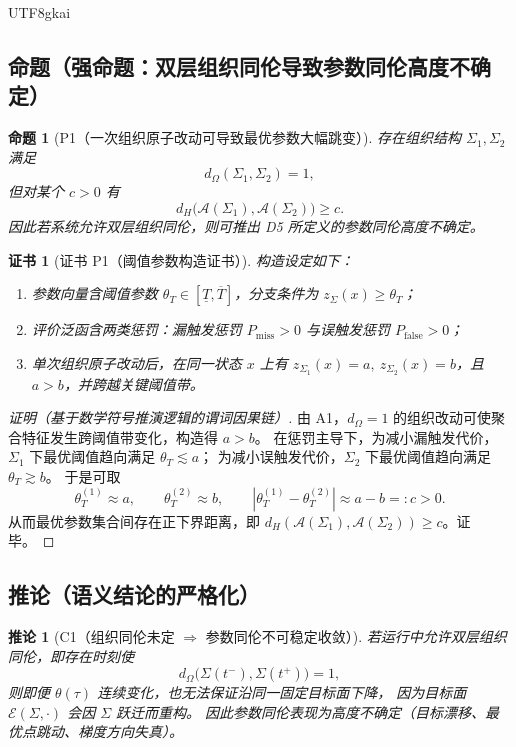 \documentclass[12pt]{article}
\newtheorem{proposition}{命题}[section]
\newtheorem{corollary}{推论}[section]
\newtheorem{Certificate}{证书}[section]
\begin{document}
\begin{CJK*}{UTF8}{gkai}
\subsection{命题（强命题：双层组织同伦导致参数同伦高度不确定）}
\label{subsec:tex28-ch8-props}

\begin{proposition}[P1（一次组织原子改动可导致最优参数大幅跳变）]
\label{prop:tex28-ch8-p1}
存在组织结构 $\Sigma_1,\Sigma_2$ 满足
\[
  d_{\Omega}(\Sigma_1,\Sigma_2)=1,
\]
但对某个 $c>0$ 有
\[
  d_H\bigl(\mathcal{A}(\Sigma_1),\mathcal{A}(\Sigma_2)\bigr)\ge c.
\]
因此若系统允许双层组织同伦，则可推出 D5 所定义的参数同伦高度不确定。
\end{proposition}

\begin{Certificate}[证书 P1（阈值参数构造证书）]
\label{cert:tex28-ch8-p1}
构造设定如下：
\begin{enumerate}
  \item 参数向量含阈值参数 $\theta_T\in[\underline T,\overline T]$，分支条件为 $z_{\Sigma}(x)\ge \theta_T$；
  \item 评价泛函含两类惩罚：漏触发惩罚 $P_{\mathrm{miss}}>0$ 与误触发惩罚 $P_{\mathrm{false}}>0$；
  \item 单次组织原子改动后，在同一状态 $x$ 上有
  $z_{\Sigma_1}(x)=a,\ z_{\Sigma_2}(x)=b$，且 $a>b$，并跨越关键阈值带。
\end{enumerate}
\end{Certificate}

\begin{proof}[证明（基于数学符号推演逻辑的谓词因果链）]
由 A1，$d_{\Omega}=1$ 的组织改动可使聚合特征发生跨阈值带变化，构造得 $a>b$。
在惩罚主导下，为减小漏触发代价，$\Sigma_1$ 下最优阈值趋向满足 $\theta_T\lesssim a$；
为减小误触发代价，$\Sigma_2$ 下最优阈值趋向满足 $\theta_T\gtrsim b$。
于是可取
\[
  \theta_T^{(1)}\approx a,\qquad \theta_T^{(2)}\approx b,\qquad
  |\theta_T^{(1)}-\theta_T^{(2)}|\approx a-b=:c>0.
\]
从而最优参数集合间存在正下界距离，即
$d_H(\mathcal{A}(\Sigma_1),\mathcal{A}(\Sigma_2))\ge c$。证毕。
\end{proof}

\subsection{推论（语义结论的严格化）}
\label{subsec:tex28-ch8-corollaries}

\begin{corollary}[C1（组织同伦未定 $\Rightarrow$ 参数同伦不可稳定收敛）]
\label{cor:tex28-ch8-c1}
若运行中允许双层组织同伦，即存在时刻使
\[
  d_{\Omega}\bigl(\Sigma(t^-),\Sigma(t^+)\bigr)=1,
\]
则即便 $\theta(\tau)$ 连续变化，也无法保证沿同一固定目标面下降，
因为目标面 $\mathcal{E}(\Sigma,\cdot)$ 会因 $\Sigma$ 跃迁而重构。
因此参数同伦表现为高度不确定（目标漂移、最优点跳动、梯度方向失真）。
\end{corollary}


\end{CJK*}
\end{document}
